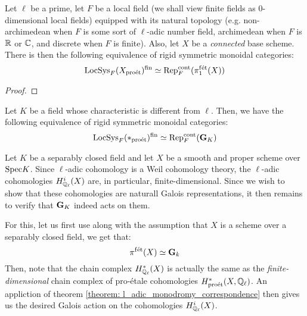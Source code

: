                 \begin{theorem} \label{theorem: l_adic_monodromy_correspondence}
                    Let $\ell$ be a prime, let $F$ be a local field (we shall view finite fields as $0$-dimensional local fields) equipped with its natural topology (e.g. non-archimedean when $F$ is some sort of $\ell$-adic number field, archimedean when $F$ is $\mathbb{R}$ or $\mathbb{C}$, and discrete when $F$ is finite). Also, let $X$ be a \textit{connected} base scheme. There is then the following equivalence of rigid symmetric monoidal categories:
                        $$\mathrm{LocSys}_F(X_{\mathrm{pro\acute{e}t}})^{\mathrm{fin}} \simeq \mathrm{Rep}_F^{\mathrm{cont}}(\pi_1^{\mathrm{f\acute{e}t}}(X))$$
                \end{theorem}
                    \begin{proof}
                        
                    \end{proof}
                \begin{corollary} \label{coro: continuous_galois_representations_as_lisse_sheaves}
                    Let $K$ be a field whose characteristic is different from $\ell$. Then, we have the following equivalence of rigid symmetric monoidal categories:
                        $$\mathrm{LocSys}_F(*_{\mathrm{pro\acute{e}t}})^{\mathrm{fin}} \simeq \mathrm{Rep}_F^{\mathrm{cont}}(\mathbf{G}_K)$$
                \end{corollary}
                \begin{example} \label{example: etale_cohomologies_as_galois_representations}
                    Let $K$ be a separably closed field and let $X$ be a smooth and proper scheme over $\mathrm{Spec} K$. Since $\ell$-adic cohomology is a Weil cohomology theory, the $\ell$-adic cohomologies $H^i_{\mathbb{Q}_{\ell}}(X)$ are, in particular, finite-dimensional. Since we wish to show that these cohomologies are naturall Galois representations, it then remains to verify that $\mathbf{G}_K$ indeed acts on them.
                                
                    For this, let us first use \cite[\href{https://stacks.math.columbia.edu/tag/0BUM}{Tag 0BUM}]{stacks} along with the assumption that $X$ is a scheme over a separably closed field, we get that:
                        $$\pi^{\mathrm{f\acute{e}t}}(X) \simeq \mathbf{G}_k$$
                    Then, note that the chain complex $H^*_{\mathbb{Q}_{\ell}}(X)$ is actually the same as the \textit{finite-dimensional} chain complex of pro-\'etale cohomologies $H^*_{\mathrm{pro\acute{e}t}}(X, \mathbb{Q}_{\ell})$. An appliction of theorem \ref{theorem: l_adic_monodromy_correspondence} then gives us the desired Galois action on the cohomologies $H^i_{\mathbb{Q}_{\ell}}(X)$.
                \end{example}
                
